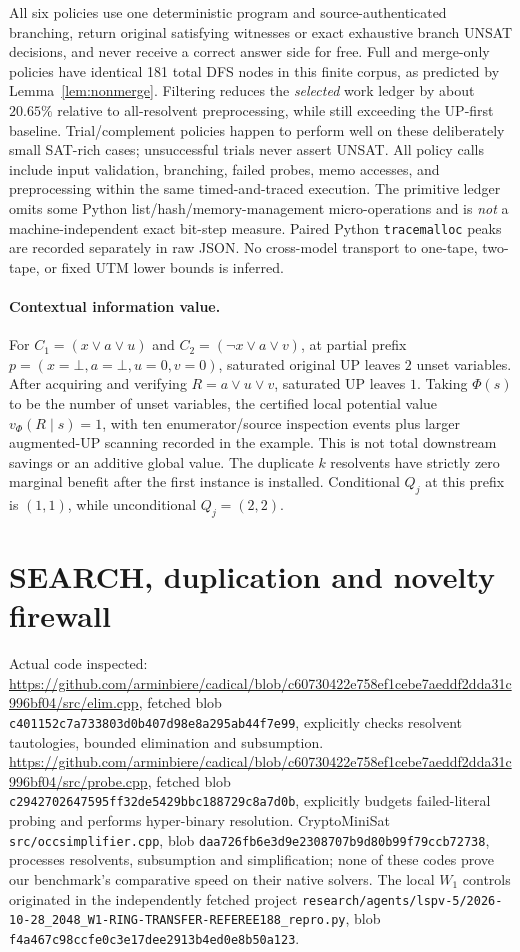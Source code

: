 \documentclass[10pt]{article}
\begin{document}
All six policies use one deterministic program and source-authenticated branching, return original satisfying witnesses or exact exhaustive branch UNSAT decisions, and never receive a correct answer side for free. Full and merge-only policies have identical 181 total DFS nodes in this finite corpus, as predicted by Lemma~\ref{lem:nonmerge}. Filtering reduces the \emph{selected} work ledger by about $20.65\%$ relative to all-resolvent preprocessing, while still exceeding the UP-first baseline. Trial/complement policies happen to perform well on these deliberately small SAT-rich cases; unsuccessful trials never assert UNSAT. All policy calls include input validation, branching, failed probes, memo accesses, and preprocessing within the same timed-and-traced execution. The primitive ledger omits some Python list/hash/memory-management micro-operations and is \emph{not} a machine-independent exact bit-step measure. Paired Python \texttt{tracemalloc} peaks are recorded separately in raw JSON. No cross-model transport to one-tape, two-tape, or fixed UTM lower bounds is inferred.

\paragraph{Contextual information value.} For $C_1=(x\lor a\lor u)$ and $C_2=(\neg x\lor a\lor v)$, at partial prefix $p=(x=\bot,a=\bot,u=0,v=0)$, saturated original UP leaves $2$ unset variables. After acquiring and verifying $R=a\lor u\lor v$, saturated UP leaves $1$. Taking $\Phi(s)$ to be the number of unset variables, the certified local potential value $v_\Phi(R\mid s)=1$, with ten enumerator/source inspection events plus larger augmented-UP scanning recorded in the example. This is not total downstream savings or an additive global value. The duplicate $k$ resolvents have strictly zero marginal benefit after the first instance is installed. Conditional $Q_j$ at this prefix is $(1,1)$, while unconditional $Q_j=(2,2)$.

\section{SEARCH, duplication and novelty firewall}
Actual code inspected: \url{https://github.com/arminbiere/cadical/blob/c60730422e758ef1cebe7aeddf2dda31c996bf04/src/elim.cpp}, fetched blob \texttt{c401152c7a733803d0b407d98e8a295ab44f7e99}, explicitly checks resolvent tautologies, bounded elimination and subsumption. \url{https://github.com/arminbiere/cadical/blob/c60730422e758ef1cebe7aeddf2dda31c996bf04/src/probe.cpp}, fetched blob \texttt{c2942702647595ff32de5429bbc188729c8a7d0b}, explicitly budgets failed-literal probing and performs hyper-binary resolution. CryptoMiniSat \texttt{src/occsimplifier.cpp}, blob \texttt{daa726fb6e3d9e2308707b9d80b99f79ccb72738}, processes resolvents, subsumption and simplification; none of these codes prove our benchmark's comparative speed on their native solvers. The local $W_1$ controls originated in the independently fetched project \texttt{research/agents/lspv-5/2026-10-28\_2048\_W1-RING-TRANSFER-REFEREE188\_repro.py}, blob \texttt{f4a467c98ccfe0c3e17dee2913b4ed0e8b50a123}.
\end{document}
